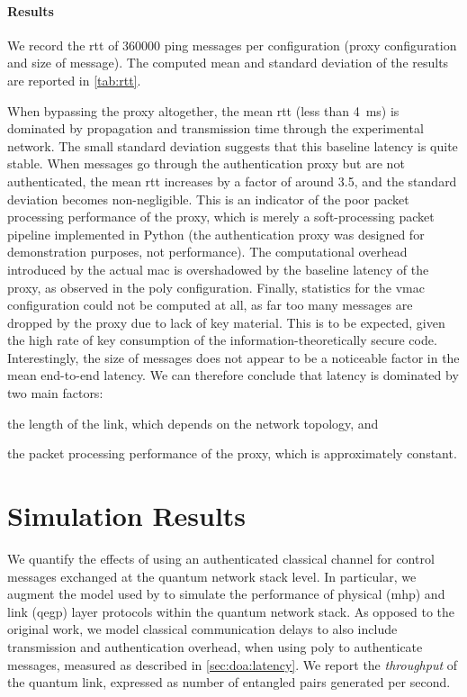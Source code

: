 \paragraph{Results}

We record the \acrlong{rtt} of \num{360000} ping messages per configuration (proxy configuration and
size of message). The computed mean and standard deviation of the results are reported in
\cref{tab:rtt}.

When bypassing the proxy altogether, the mean \acrshort{rtt} (less than \qty{4}{\ms}) is dominated
by propagation and transmission time through the experimental network. The small standard deviation
suggests that this baseline latency is quite stable. When messages go through the authentication
proxy but are not authenticated, the mean \acrshort{rtt} increases by a factor of around \num{3.5},
and the standard deviation becomes non-negligible. This is an indicator of the poor packet
processing performance of the proxy, which is merely a soft-processing packet pipeline implemented
in Python (the authentication proxy was designed for demonstration purposes, not performance). The
computational overhead introduced by the actual \acrshort{mac} is overshadowed by the baseline
latency of the proxy, as observed in the \acrshort{poly} configuration. Finally, statistics for the
\acrshort{vmac} configuration could not be computed at all, as far too many messages are dropped by
the proxy due to lack of key material. This is to be expected, given the high rate of key
consumption of the information-theoretically secure code. Interestingly, the size of messages does
not appear to be a noticeable factor in the mean end-to-end latency. We can therefore conclude that
latency is dominated by two main factors:
%
\begin{inlinelist}
    \item the length of the link, which depends on the network topology, and
    \item the packet processing performance of the proxy, which is approximately constant.
\end{inlinelist}

\section{Simulation Results}
\label{sec:doa:results}

We quantify the effects of using an authenticated classical channel for control messages exchanged
at the quantum network stack level. In particular, we augment the model used by
\textcite{dahlberg_2019_egp} to simulate the performance of physical (\acrshort{mhp}) and link
(\acrshort{qegp}) layer protocols within the quantum network stack. As opposed to the original work,
we model classical communication delays to also include transmission and authentication overhead,
when using \acrshort{poly} to authenticate messages, measured as described in
\cref{sec:doa:latency}. We report the \emph{throughput} of the quantum link, expressed as number of
entangled pairs generated per second.


